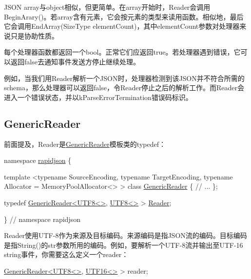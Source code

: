J\+S\+ON array与object相似，但更简单。在array开始时，{\ttfamily Reader}会调用{\ttfamily Begin\+Arary()}。若array含有元素，它会按元素的类型来读用函数。相似地，最后它会调用{\ttfamily End\+Array(\+Size\+Type element\+Count)}，其中{\ttfamily element\+Count}参数对处理器来说只是协助性质。

每个处理器函数都返回一个{\ttfamily bool}。正常它们应返回{\ttfamily true}。若处理器遇到错误，它可以返回{\ttfamily false}去通知事件发送方停止继续处理。

例如，当我们用{\ttfamily Reader}解析一个\+J\+S\+O\+N时，处理器检测到该\+J\+S\+O\+N并不符合所需的schema，那么处理器可以返回{\ttfamily false}，令{\ttfamily Reader}停止之后的解析工作。而{\ttfamily Reader}会进入一个错误状态，并以{\ttfamily k\+Parse\+Error\+Termination}错误码标识。\hypertarget{md_Commun_Externe_RapidJSON_doc_sax.zh-cn_GenericReader}{}\subsection{Generic\+Reader}\label{md_Commun_Externe_RapidJSON_doc_sax.zh-cn_GenericReader}
前面提及，{\ttfamily Reader}是{\ttfamily \hyperlink{class_generic_reader}{Generic\+Reader}}模板类的typedef：


\begin{DoxyCode}
\textcolor{keyword}{namespace }\hyperlink{namespacerapidjson}{rapidjson} \{

\textcolor{keyword}{template} <\textcolor{keyword}{typename} SourceEncoding, \textcolor{keyword}{typename} TargetEncoding, \textcolor{keyword}{typename} Allocator = MemoryPoolAllocator<> >
\textcolor{keyword}{class }\hyperlink{class_generic_reader}{GenericReader} \{
    \textcolor{comment}{// ...}
\};

\textcolor{keyword}{typedef} \hyperlink{class_generic_reader}{GenericReader<UTF8<>}, \hyperlink{struct_u_t_f8}{UTF8<>} > \hyperlink{reader_8h_a84f3b66a66647f4ac4267078359188ba}{Reader};

\} \textcolor{comment}{// namespace rapidjson}
\end{DoxyCode}


{\ttfamily Reader}使用\+U\+T\+F-\/8作为来源及目标编码。来源编码是指\+J\+S\+O\+N流的编码。目标编码是指{\ttfamily String()}的{\ttfamily str}参数所用的编码。例如，要解析一个\+U\+T\+F-\/8流并输出至\+U\+T\+F-\/16 string事件，你需要这么定义一个reader：


\begin{DoxyCode}
\hyperlink{class_generic_reader}{GenericReader<UTF8<>}, \hyperlink{struct_u_t_f16}{UTF16<>} > reader;
\end{DoxyCode}


